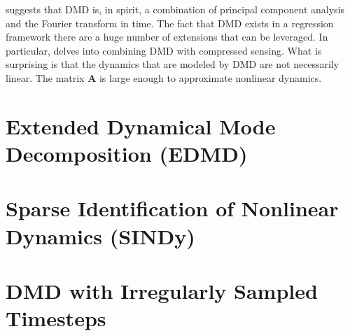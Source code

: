  suggests that DMD is, in spirit, a combination of principal component analysis and the Fourier transform in time. The fact that DMD exists in a regression framework there are a huge number of extensions that can be leveraged. In particular,  delves into combining DMD with compressed sensing. What is surprising is that the dynamics that are modeled by DMD are not necessarily linear. The matrix $\mathbf{A}$ is large enough to approximate nonlinear dynamics.


\section{Extended Dynamical Mode Decomposition (EDMD)}
\label{sec:edmd}


\section{Sparse Identification of Nonlinear Dynamics (SINDy)}
\label{sec:sindy}

\section{DMD with Irregularly Sampled Timesteps}
